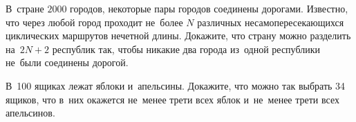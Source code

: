 \begin{problems}
\item
В~стране $2000$ городов, некоторые пары городов соединены дорогами.
Известно, что через любой город проходит не~более $N$ различных
несамопересекающихся циклических маршрутов нечетной длины.
Докажите, что страну можно разделить на~$2 N + 2$ республик так, чтобы никакие
два города из~одной республики не~были соединены дорогой.

\item
В~100 ящиках лежат яблоки и~апельсины.
Докажите, что можно так выбрать 34 ящиков, что в~них окажется не~менее трети
всех яблок и~не~менее трети всех апельсинов.

\end{problems}

